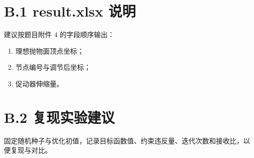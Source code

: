 \section*{B.1 result.xlsx 说明}
建议按题目附件 4 的字段顺序输出：
\begin{enumerate}
  \item 理想抛物面顶点坐标；
  \item 节点编号与调节后坐标；
  \item 促动器伸缩量。
\end{enumerate}

\section*{B.2 复现实验建议}
固定随机种子与优化初值，记录目标函数值、约束违反量、迭代次数和接收比，以便复现与对比。
